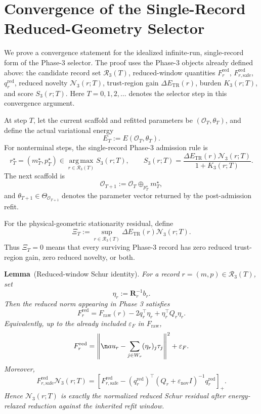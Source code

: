 \documentclass[
  reprint,
  amsmath,
  amssymb,
  aps,
  pra,
  nofootinbib,
  superscriptaddress,
  floatfix
]{revtex4-2}
\newenvironment{schurlemma}[1][]
{\par\medskip\noindent\textbf{Lemma}\if\relax\detokenize{#1}\relax\else\ (#1)\fi.\space\itshape}
{\par\medskip}
\begin{document}
\section{Convergence of the Single-Record Reduced-Geometry Selector}

We prove a convergence statement for the idealized infinite-run,
single-record form of the Phase-3 selector.  The proof uses the Phase-3
objects already defined above: the candidate record set
\(\mathcal R_3(T)\), reduced-window quantities
$F_r^{\mathrm{red}}$, $F_{r,\mathrm{safe}}^{\mathrm{red}}$,
$q_r^{\mathrm{red}}$, reduced novelty \(\mathcal N_3(r;T)\), trust-region
gain \(\Delta E_{\mathrm{TR}}(r)\), burden \(K_3(r;T)\), and score
\(S_3(r;T)\).  Here \(T=0,1,2,\ldots\) denotes the selector step in
this convergence argument.

At step \(T\), let the current scaffold and refitted parameters be
\((\mathcal O_T,\theta_T)\), and define the actual variational energy
\[
E_T:=E(\mathcal O_T,\theta_T).
\]
For nonterminal steps, the single-record Phase-3 admission rule is
\[
r_T^\star=(m_T^\star,p_T^\star)
\in
\operatorname*{arg\,max}_{r\in\mathcal R_3(T)}S_3(r;T),
\qquad
S_3(r;T)
=
\frac{\Delta E_{\mathrm{TR}}(r)\mathcal N_3(r;T)}
{1+K_3(r;T)}.
\]
The next scaffold is
\[
\mathcal O_{T+1}:=\mathcal O_T\oplus_{p_T^\star}m_T^\star,
\]
and \(\theta_{T+1}\in\Theta_{\mathcal O_{T+1}}\) denotes the parameter
vector returned by the post-admission refit.

For the physical-geometric stationarity residual, define
\[
\Xi_T
:=
\sup_{r\in\mathcal R_3(T)}
\Delta E_{\mathrm{TR}}(r)\mathcal N_3(r;T).
\]
Thus \(\Xi_T=0\) means that every surviving Phase-3 record has zero
reduced trust-region gain, zero reduced novelty, or both.

\begin{schurlemma}[Reduced-window Schur identity]
For a record \(r=(m,p)\in\mathcal R_3(T)\), set
\[
\eta_r:=\mathbf R_r^{-1}b_r.
\]
Then the reduced norm appearing in Phase 3 satisfies
\[
F_r^{\mathrm{red}}
=
F_{\mathrm{raw}}(r)
-2q_r^\top\eta_r
+\eta_r^\top Q_r\eta_r.
\]
Equivalently, up to the already included \(\varepsilon_F\) in
\(F_{\mathrm{raw}}\),
\[
F_r^{\mathrm{red}}
=
\left\|\n	au_r-\sum_{j\in W_r}(\eta_r)_j\tau_j\right\|^2+\varepsilon_F.
\]
Moreover,
\[
F_{r,\mathrm{safe}}^{\mathrm{red}}\mathcal N_3(r;T)
=
\left[
F_{r,\mathrm{safe}}^{\mathrm{red}}
-
(q_r^{\mathrm{red}})^\top
(Q_r+\varepsilon_{\mathrm{nov}}I)^{-1}
q_r^{\mathrm{red}}
\right]_{+}.
\]
Hence \(\mathcal N_3(r;T)\) is exactly the normalized reduced Schur
residual after energy-relaxed reduction against the inherited refit
window.
\end{schurlemma}
\end{document}
